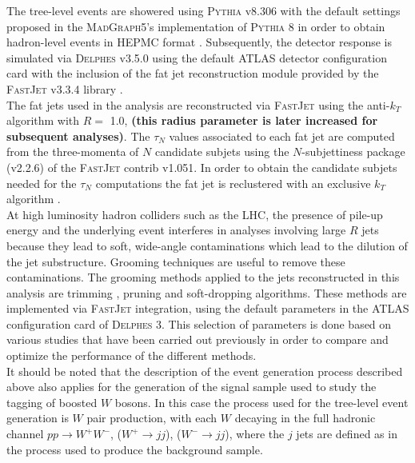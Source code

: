 \documentclass[main]{subfiles} %
\begin{document}
The tree-level events are showered using \textsc{Pythia} v8.306 \cite{Sjostrand2015} with the default settings proposed in the \textsc{MadGraph5}'s implementation of \textsc{Pythia 8} in order to obtain hadron-level events in \textsc{HEPMC} format \cite{Dobbs2001}. Subsequently, the detector response is simulated via \textsc{Delphes} v3.5.0 \cite{deFavereau2014} using the default ATLAS detector configuration card with the inclusion of the fat jet reconstruction module provided by the \textsc{FastJet} v3.3.4 library \cite{Cacciari2012}.\\

The fat jets used in the analysis are reconstructed via \textsc{FastJet} using the anti-$k_T$ algorithm with $R =$ 1.0, \textbf{(this radius parameter is later increased for subsequent analyses)}. The $\tau_N$ values associated to each fat jet are computed from the three-momenta of $N$ candidate subjets using the $N$-subjettiness package (v2.2.6) of the \textsc{FastJet} contrib v1.051. In order to obtain the candidate subjets needed for the $\tau_N$ computations the fat jet is reclustered with an exclusive $k_T$ algorithm \cite{Khelifa-Kerfa2022}.\\

At high luminosity hadron colliders such as the LHC, the presence of pile-up energy and the underlying event interferes in analyses involving large $R$ jets because they lead to soft, wide-angle contaminations which lead to the dilution of the jet substructure. Grooming techniques are useful to remove these contaminations. The grooming methods applied to the jets reconstructed in this analysis are trimming \cite{Krohn2010}, pruning \cite{Ellis2009} and soft-dropping \cite{Larkoski2014} algorithms. These methods are implemented via \textsc{FastJet} integration, using the default parameters in the ATLAS configuration card of \textsc{Delphes 3}. This selection of parameters is done based on various studies that have been carried out previously in order to compare and optimize the performance of the different methods.\\

It should be noted that the description of the event generation process described above also applies for the generation of the signal sample used to study the tagging of boosted $W$ bosons. In this case the process used for the tree-level event generation is $W$ pair production, with each $W$ decaying in the full hadronic channel $pp \rightarrow W^{+}W^{-}$, ($W^{+} \rightarrow jj$), ($W^{-} \rightarrow jj$), where the $j$ jets are defined as in the process used to produce the background sample.\\
\end{document}
